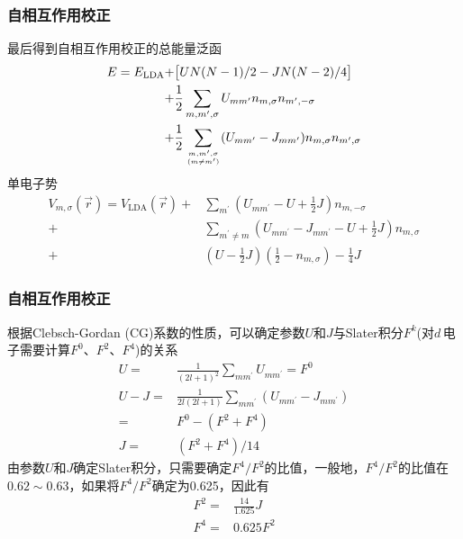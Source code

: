 \documentclass[cjk,slidestop,compress,mathserif,blue]{beamer}
\begin{document}
\frame
{
	\frametitle{自相互作用校正}
	最后得到自相互作用校正的总能量泛函
	\begin{displaymath}
		\begin{aligned}
			E=E_{\mathrm{LDA}}+&\big[UN(N-1)/2-JN(N-2)/4\big]\\
			+&\frac12\sum_{m,m^{\prime},\sigma}U_{mm^{\prime}}n_{m,\sigma}n_{m^{\prime},-\sigma}\\
			+&\frac12\sum_{m,m^{\prime},\sigma\atop(m\neq m^{\prime})}(U_{mm^{\prime}}-J_{mm^{\prime}})n_{m,\sigma}n_{m^{\prime},\sigma}
		\end{aligned}
	\end{displaymath}
	单电子势
	\begin{displaymath}
		\begin{aligned}
			V_{m,\sigma}(\vec r)=V_{\mathrm{LDA}}(\vec r)+&\sum_{m^{\prime}}(U_{mm^{\prime}}-U+\frac12J)n_{m,-\sigma}\\
			+&\sum_{m^{\prime}\neq m}(U_{mm^{\prime}}-J_{mm^{\prime}}-U+\frac12J)n_{m,\sigma}\\
			+&(U-\frac12J)(\frac12-n_{m,\sigma})-\frac14J
		\end{aligned}
	\end{displaymath}
}

\frame
{
	\frametitle{自相互作用校正}
	根据\textrm{Clebsch-Gordan (CG)}系数的性质，可以确定参数$U$和$J$与\textrm{Slater}积分$F^k$(对$d$\,电子需要计算$F^0$、$F^2$、$F^4$)的关系
	\begin{displaymath}
		\begin{aligned}
			U=&\frac1{(2l+1)^2}\sum_{mm^{\prime}}U_{mm^{\prime}}=F^0\\
			U-J=&\frac1{2l(2l+1)}\sum_{mm^{\prime}}(U_{mm^{\prime}}-J_{mm^{\prime}})\\
			=&F^0-(F^2+F^4)	\\
			J=&(F^2+F^4)/14
		\end{aligned}
	\end{displaymath}
	由参数$U$和$J$确定\textrm{Slater}积分，只需要确定$F^4/F^2$的比值，一般地，$F^4/F^2$的比值在$0.62\sim0.63$，如果将$F^4/F^2$确定为0.625，因此有
	\begin{displaymath}
		\begin{aligned}
			F^2=&\frac{14}{1.625}J\\
			F^4=&0.625F^2
		\end{aligned}
	\end{displaymath}
}
\end{document}
